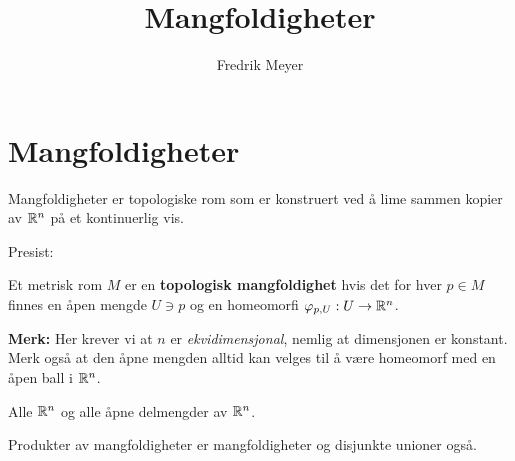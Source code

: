 \documentclass[11pt, english]{article}
\begin{document}
\title{Mangfoldigheter}
\author{Fredrik Meyer}
\maketitle 

\section{Mangfoldigheter}

Mangfoldigheter er topologiske rom som er konstruert ved å lime sammen kopier av $\mathbb{R}^n$ på et kontinuerlig vis.

Presist:

\begin{defi}
Et metrisk rom $M$ er en \textbf{topologisk mangfoldighet} hvis det for hver $p \in M$ finnes en åpen mengde $U \ni p$ og en homeomorfi $\varphi_{p,U}:U \to \mathbb{R}^n$. 
\end{defi}


\textbf{Merk:} Her krever vi at $n$ er \emph{ekvidimensjonal}, nemlig at dimensjonen er konstant. Merk også at den åpne mengden alltid kan velges til å være homeomorf med en åpen ball i $\mathbb{R}^n$.

\begin{example}
Alle $\mathbb{R}^n$ og alle åpne delmengder av $\mathbb{R}^n$.
\end{example}
\begin{example}
Produkter av mangfoldigheter er mangfoldigheter og disjunkte unioner også.
\end{example}
\end{document}
